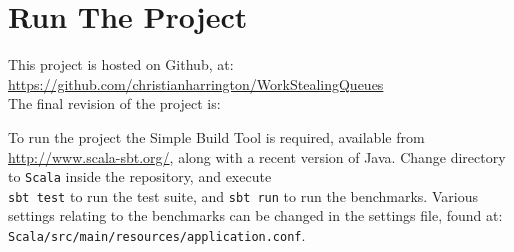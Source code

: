 \section{Run The Project}
\label{app:run}

This project is hosted on Github, at:\\ \url{https://github.com/christianharrington/WorkStealingQueues}
\\
The final revision of the project is: 

To run the project the Simple Build Tool is required, available from \url{http://www.scala-sbt.org/}, along with a recent version of Java. 
Change directory to \texttt{Scala} inside the repository, and execute \\ \texttt{sbt test} to run the test suite, and \texttt{sbt run} to run the benchmarks.
Various settings relating to the benchmarks can be changed in the settings file, found at: \\ \texttt{Scala/src/main/resources/application.conf}.
